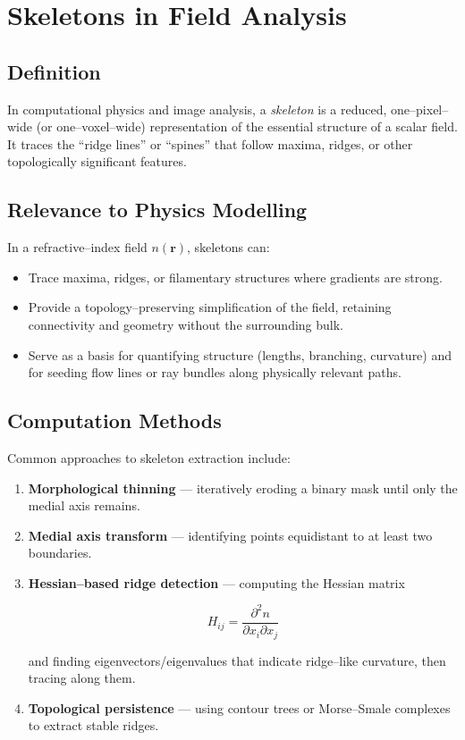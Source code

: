 \section*{Skeletons in Field Analysis}

\subsection*{Definition}
In computational physics and image analysis, a \emph{skeleton} is a reduced, one--pixel--wide (or one--voxel--wide) representation of the essential structure of a scalar field. It traces the ``ridge lines'' or ``spines'' that follow maxima, ridges, or other topologically significant features.

\subsection*{Relevance to Physics Modelling}
In a refractive--index field $n(\mathbf{r})$, skeletons can:
\begin{itemize}
    \item Trace maxima, ridges, or filamentary structures where gradients are strong.
    \item Provide a topology--preserving simplification of the field, retaining connectivity and geometry without the surrounding bulk.
    \item Serve as a basis for quantifying structure (lengths, branching, curvature) and for seeding flow lines or ray bundles along physically relevant paths.
\end{itemize}

\subsection*{Computation Methods}
Common approaches to skeleton extraction include:
\begin{enumerate}
    \item \textbf{Morphological thinning} --- iteratively eroding a binary mask until only the medial axis remains.
    \item \textbf{Medial axis transform} --- identifying points equidistant to at least two boundaries.
    \item \textbf{Hessian--based ridge detection} --- computing the Hessian matrix
    

\[
    H_{ij} = \frac{\partial^2 n}{\partial x_i \partial x_j}
    \]


    and finding eigenvectors/eigenvalues that indicate ridge--like curvature, then tracing along them.
    \item \textbf{Topological persistence} --- using contour trees or Morse--Smale complexes to extract stable ridges.
\end{enumerate}

